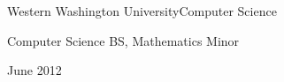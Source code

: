 \documentclass{article}
\newenvironment{mylist}[2]{
  \subsubsection*{#1}
  \begin{multicols}{#2}
  \small
  \begin{list}{}{}
   \setlength{\topsep}{0pt}
   \setlength{\itemsep}{1pt}
   \setlength{\parskip}{0pt}
   \setlength{\parsep}{0pt}}{\end{list}\end{multicols}\normalsize}
\newenvironment{*mylist}[2]{
  \subsection*{#1\hfill#2}
  \small
  \begin{list}{}{}
   \setlength{\topsep}{0pt}
   \setlength{\itemsep}{1pt}
   \setlength{\parskip}{0pt}
   \setlength{\parsep}{0pt}}{\end{list}\normalsize}
\begin{document}
\begin{comment}
\begin{*mylist}{Extra Curricular}{MOOC/Bootcamp}
\item Coursera / EdX / Stanford Online / Hack Oregon
\end{*mylist}

\begin{mylist}{Courses :}{2}
\item {\em Linear Algebra Done Right}
\item {\em Simulation and Modeling of Natural Processes}
\item {\em Convex Optimization}
\item Functional Programming in Scala
\item Applied Cryptography
\item Agile Machine Learning
\end{mylist}
\end{comment}

\begin{comment}
\subsection*{Continued Education}

\begin{mylist}{Courses :}{2}
\item Agile Machine Learning
\item Functional Programming in Scala
\item Applied Cryptography
\end{mylist}
\end{comment}

\begin{*mylist}{Western Washington University}{Computer Science}
\item Computer Science BS, Mathematics Minor
\item June 2012
\end{*mylist}
\end{document}
